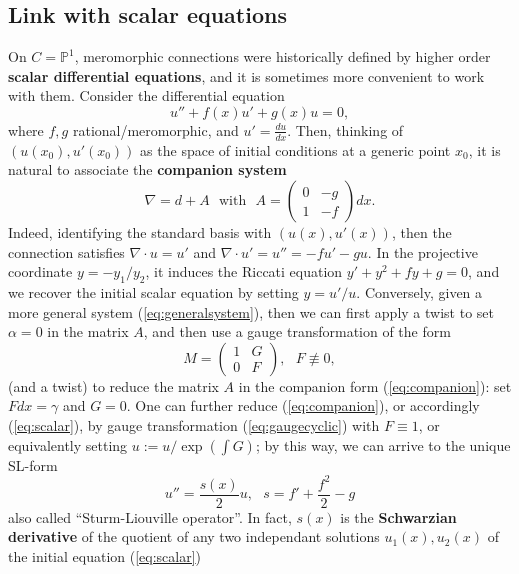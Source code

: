 \documentclass[12]{amsart}
\begin{document}
\subsection{Link with scalar equations}
On $C=\mathbb P^1$, meromorphic connections were historically defined by 
higher order {\bf scalar differential equations}, and it is sometimes more convenient to work with them.
Consider the differential equation 
\begin{equation}\label{eq:scalar}
u''+f(x)u'+g(x)u=0,
\end{equation}
 where $f,g$ rational/meromorphic, and $u'=\frac{du}{dx}$.
Then, thinking of $(u(x_0),u'(x_0))$ as the space of initial conditions at a generic point $x_0$, 
it is natural to associate the {\bf companion system}
\begin{equation}\label{eq:companion}
\nabla=d+A\ \ \ \text{with}\ \ \ A=\begin{pmatrix}0&-g\\ 1&-f\end{pmatrix}dx.
\end{equation}
Indeed, identifying the standard basis with $(u(x),u'(x))$, then the connection satisfies 
$\nabla\cdot u=u'$ and $\nabla\cdot u'=u''=-fu'-gu$. In the projective coordinate $y=-y_1/y_2$, 
it induces the Riccati equation $y'+y^2+fy+g=0$, and we recover the initial scalar equation 
by setting $y=u'/u$.
Conversely, given a more general system (\ref{eq:generalsystem}), then we can first apply a twist to set $\alpha=0$
in the matrix $A$, and then use a gauge transformation of the form
\begin{equation}\label{eq:gaugecyclic}
M=\begin{pmatrix}1&G\\0&F\end{pmatrix},\ \ \ F\not\equiv0,
\end{equation}
(and a twist) to reduce the matrix $A$ in the companion form (\ref{eq:companion}): set $Fdx=\gamma$ and $G=0$.
One can further reduce (\ref{eq:companion}), or accordingly (\ref{eq:scalar}), by gauge transformation (\ref{eq:gaugecyclic})
with $F\equiv1$, or equivalently setting $u:=u/\exp(\int G)$; by this way, we can arrive to the unique SL-form 
\begin{equation}\label{eqSLscalar}
u''=\frac{s(x)}{2}u,\ \ \ s=f'+\frac{f^2}{2}-g
\end{equation}
also called ``Sturm-Liouville operator''. In fact, $s(x)$ is the {\bf Schwarzian derivative} of the quotient of any two 
independant solutions $u_1(x),u_2(x)$ of the initial equation (\ref{eq:scalar})
\end{document}
